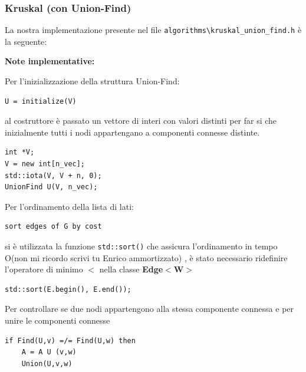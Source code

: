 \documentclass[]{article}
\begin{document}
\subsubsection{Kruskal (con Union-Find)}
\begin{flushleft}
La nostra implementazione presente nel file \verb|algorithms\kruskal_union_find.h| è la seguente:

\lstset{language=c++, style=mystyle}


\textbf{Note implementative:}

\medskip
Per l'inizializzazione della struttura Union-Find:

\begin{lstlisting}
U = initialize(V)
\end{lstlisting}

\smallskip
al costruttore è passato un vettore di interi con valori distinti per far si che inizialmente tutti i nodi appartengano a componenti connesse distinte.

\lstset{language=c++, style=mystyle, firstnumber=3}  	 	
\begin{lstlisting}
int *V;
V = new int[n_vec];
std::iota(V, V + n, 0);
UnionFind U(V, n_vec);
\end{lstlisting}

\medskip
Per l'ordinamento della lista di lati:

\begin{lstlisting}
sort edges of G by cost
\end{lstlisting}

\smallskip
si è utilizzata la funzione \verb|std::sort()| che assicura l'ordinamento in tempo O(non mi ricordo scrivi tu Enrico ammortizzato)%
, è stato necessario ridefinire l'operatore di minimo \textbf{$<$} nella classe \textbf{Edge$<$W$>$}
 
\lstset{language=c++, style=mystyle, firstnumber=7} 	 	
\begin{lstlisting}
std::sort(E.begin(), E.end());
\end{lstlisting}

\medskip
Per controllare se due nodi appartengono alla stessa componente connessa e per unire le componenti connesse
\begin{lstlisting}
if Find(U,v) =/= Find(U,w) then
	A = A U (v,w)
	Union(U,v,w)
\end{lstlisting}


\end{flushleft}
\end{document}
